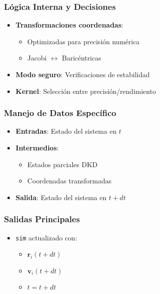 \subsubsection{Lógica Interna y Decisiones}
\begin{itemize}
    \item \textbf{Transformaciones coordenadas}:
    \begin{itemize}
        \item Optimizadas para precisión numérica
        \item Jacobi $\leftrightarrow$ Baricéntricas
    \end{itemize}
    \item \textbf{Modo seguro}: Verificaciones de estabilidad
    \item \textbf{Kernel}: Selección entre precisión/rendimiento
\end{itemize}

\subsubsection{Manejo de Datos Específico}
\begin{itemize}
    \item \textbf{Entradas}: Estado del sistema en $t$
    \item \textbf{Intermedios}:
    \begin{itemize}
        \item Estados parciales DKD
        \item Coordenadas transformadas
    \end{itemize}
    \item \textbf{Salida}: Estado del sistema en $t + dt$
\end{itemize}

\subsubsection{Salidas Principales}
\begin{itemize}
    \item \texttt{sim} actualizado con:
    \begin{itemize}
        \item $\mathbf{r}_i(t + dt)$
        \item $\mathbf{v}_i(t + dt)$
        \item $t = t + dt$
    \end{itemize}
\end{itemize}

